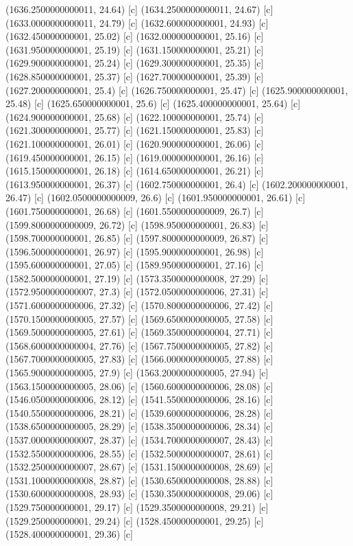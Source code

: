 {{{(1636.2500000000011, 24.64) [c] 
(1634.2500000000011, 24.67) [c] 
(1633.0000000000011, 24.79) [c] 
(1632.600000000001, 24.93) [c] 
(1632.450000000001, 25.02) [c] 
(1632.000000000001, 25.16) [c] 
(1631.950000000001, 25.19) [c] 
(1631.150000000001, 25.21) [c] 
(1629.900000000001, 25.24) [c] 
(1629.300000000001, 25.35) [c] 
(1628.850000000001, 25.37) [c] 
(1627.700000000001, 25.39) [c] 
(1627.200000000001, 25.4) [c] 
(1626.750000000001, 25.47) [c] 
(1625.900000000001, 25.48) [c] 
(1625.650000000001, 25.6) [c] 
(1625.400000000001, 25.64) [c] 
(1624.900000000001, 25.68) [c] 
(1622.100000000001, 25.74) [c] 
(1621.300000000001, 25.77) [c] 
(1621.150000000001, 25.83) [c] 
(1621.100000000001, 26.01) [c] 
(1620.900000000001, 26.06) [c] 
(1619.450000000001, 26.15) [c] 
(1619.000000000001, 26.16) [c] 
(1615.150000000001, 26.18) [c] 
(1614.650000000001, 26.21) [c] 
(1613.950000000001, 26.37) [c] 
(1602.750000000001, 26.4) [c] 
(1602.200000000001, 26.47) [c] 
(1602.0500000000009, 26.6) [c] 
(1601.950000000001, 26.61) [c] 
(1601.750000000001, 26.68) [c] 
(1601.5500000000009, 26.7) [c] 
(1599.8000000000009, 26.72) [c] 
(1598.950000000001, 26.83) [c] 
(1598.700000000001, 26.85) [c] 
(1597.8000000000009, 26.87) [c] 
(1596.500000000001, 26.97) [c] 
(1595.900000000001, 26.98) [c] 
(1595.600000000001, 27.05) [c] 
(1589.950000000001, 27.16) [c] 
(1582.500000000001, 27.19) [c] 
(1573.3500000000008, 27.29) [c] 
(1572.9500000000007, 27.3) [c] 
(1572.0500000000006, 27.31) [c] 
(1571.6000000000006, 27.32) [c] 
(1570.8000000000006, 27.42) [c] 
(1570.1500000000005, 27.57) [c] 
(1569.6500000000005, 27.58) [c] 
(1569.5000000000005, 27.61) [c] 
(1569.3500000000004, 27.71) [c] 
(1568.6000000000004, 27.76) [c] 
(1567.7500000000005, 27.82) [c] 
(1567.7000000000005, 27.83) [c] 
(1566.0000000000005, 27.88) [c] 
(1565.9000000000005, 27.9) [c] 
(1563.2000000000005, 27.94) [c] 
(1563.1500000000005, 28.06) [c] 
(1560.6000000000006, 28.08) [c] 
(1546.0500000000006, 28.12) [c] 
(1541.5500000000006, 28.16) [c] 
(1540.5500000000006, 28.21) [c] 
(1539.6000000000006, 28.28) [c] 
(1538.6500000000005, 28.29) [c] 
(1538.3500000000006, 28.34) [c] 
(1537.0000000000007, 28.37) [c] 
(1534.7000000000007, 28.43) [c] 
(1532.5500000000006, 28.55) [c] 
(1532.5000000000007, 28.61) [c] 
(1532.2500000000007, 28.67) [c] 
(1531.1500000000008, 28.69) [c] 
(1531.1000000000008, 28.87) [c] 
(1530.6500000000008, 28.88) [c] 
(1530.6000000000008, 28.93) [c] 
(1530.3500000000008, 29.06) [c] 
(1529.750000000001, 29.17) [c] 
(1529.3500000000008, 29.21) [c] 
(1529.250000000001, 29.24) [c] 
(1528.450000000001, 29.25) [c] 
(1528.400000000001, 29.36) [c] 
}}}
